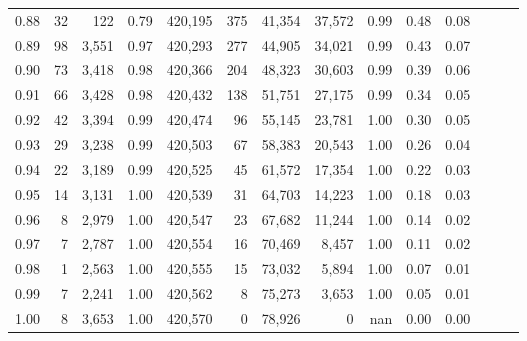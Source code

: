 \begin{tabular}{rrrrrrrrrrrrrr}
0.88 &      32 &    122 &  0.79 &  420,195 &      375 &  41,354 &  37,572 &  0.99 &  0.48 &      0.08 \\
0.89 &      98 &  3,551 &  0.97 &  420,293 &      277 &  44,905 &  34,021 &  0.99 &  0.43 &      0.07 \\
0.90 &      73 &  3,418 &  0.98 &  420,366 &      204 &  48,323 &  30,603 &  0.99 &  0.39 &      0.06 \\
0.91 &      66 &  3,428 &  0.98 &  420,432 &      138 &  51,751 &  27,175 &  0.99 &  0.34 &      0.05 \\
0.92 &      42 &  3,394 &  0.99 &  420,474 &       96 &  55,145 &  23,781 &  1.00 &  0.30 &      0.05 \\
0.93 &      29 &  3,238 &  0.99 &  420,503 &       67 &  58,383 &  20,543 &  1.00 &  0.26 &      0.04 \\
0.94 &      22 &  3,189 &  0.99 &  420,525 &       45 &  61,572 &  17,354 &  1.00 &  0.22 &      0.03 \\
0.95 &      14 &  3,131 &  1.00 &  420,539 &       31 &  64,703 &  14,223 &  1.00 &  0.18 &      0.03 \\
0.96 &       8 &  2,979 &  1.00 &  420,547 &       23 &  67,682 &  11,244 &  1.00 &  0.14 &      0.02 \\
0.97 &       7 &  2,787 &  1.00 &  420,554 &       16 &  70,469 &   8,457 &  1.00 &  0.11 &      0.02 \\
0.98 &       1 &  2,563 &  1.00 &  420,555 &       15 &  73,032 &   5,894 &  1.00 &  0.07 &      0.01 \\
0.99 &       7 &  2,241 &  1.00 &  420,562 &        8 &  75,273 &   3,653 &  1.00 &  0.05 &      0.01 \\
1.00 &       8 &  3,653 &  1.00 &  420,570 &        0 &  78,926 &       0 &   nan &  0.00 &      0.00 \\
\bottomrule
\end{tabular}
